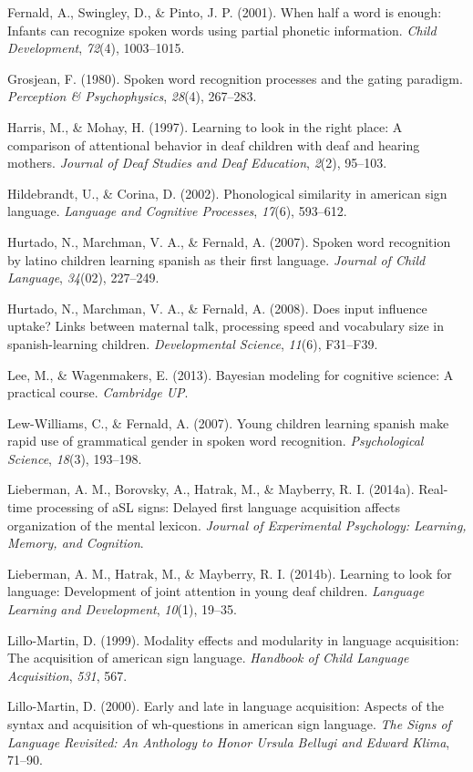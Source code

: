 \documentclass[12pt,]{article}
\begin{document}
Fernald, A., Swingley, D., \& Pinto, J. P. (2001). When half a word is
enough: Infants can recognize spoken words using partial phonetic
information. \emph{Child Development}, \emph{72}(4), 1003--1015.

Grosjean, F. (1980). Spoken word recognition processes and the gating
paradigm. \emph{Perception \& Psychophysics}, \emph{28}(4), 267--283.

Harris, M., \& Mohay, H. (1997). Learning to look in the right place: A
comparison of attentional behavior in deaf children with deaf and
hearing mothers. \emph{Journal of Deaf Studies and Deaf Education},
\emph{2}(2), 95--103.

Hildebrandt, U., \& Corina, D. (2002). Phonological similarity in
american sign language. \emph{Language and Cognitive Processes},
\emph{17}(6), 593--612.

Hurtado, N., Marchman, V. A., \& Fernald, A. (2007). Spoken word
recognition by latino children learning spanish as their first language.
\emph{Journal of Child Language}, \emph{34}(02), 227--249.

Hurtado, N., Marchman, V. A., \& Fernald, A. (2008). Does input
influence uptake? Links between maternal talk, processing speed and
vocabulary size in spanish-learning children. \emph{Developmental
Science}, \emph{11}(6), F31--F39.

Lee, M., \& Wagenmakers, E. (2013). Bayesian modeling for cognitive
science: A practical course. \emph{Cambridge UP}.

Lew-Williams, C., \& Fernald, A. (2007). Young children learning spanish
make rapid use of grammatical gender in spoken word recognition.
\emph{Psychological Science}, \emph{18}(3), 193--198.

Lieberman, A. M., Borovsky, A., Hatrak, M., \& Mayberry, R. I. (2014a).
Real-time processing of aSL signs: Delayed first language acquisition
affects organization of the mental lexicon. \emph{Journal of
Experimental Psychology: Learning, Memory, and Cognition}.

Lieberman, A. M., Hatrak, M., \& Mayberry, R. I. (2014b). Learning to
look for language: Development of joint attention in young deaf
children. \emph{Language Learning and Development}, \emph{10}(1),
19--35.

Lillo-Martin, D. (1999). Modality effects and modularity in language
acquisition: The acquisition of american sign language. \emph{Handbook
of Child Language Acquisition}, \emph{531}, 567.

Lillo-Martin, D. (2000). Early and late in language acquisition: Aspects
of the syntax and acquisition of wh-questions in american sign language.
\emph{The Signs of Language Revisited: An Anthology to Honor Ursula
Bellugi and Edward Klima}, 71--90.
\end{document}
